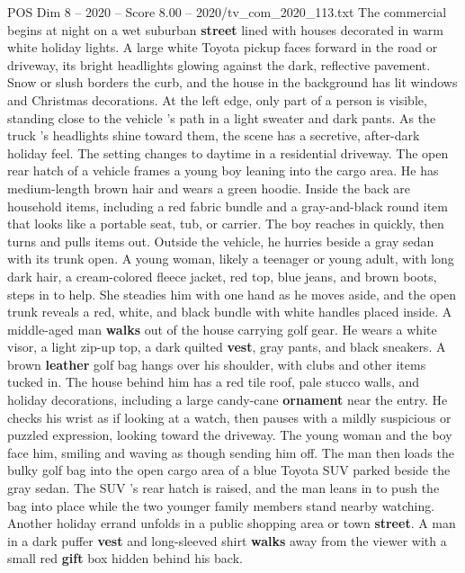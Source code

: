 \begin{textsample}{POS Dim 8 – 2020 – Score 8.00 – 2020/tv\_com\_2020\_113.txt}  \label{ex:f8_pos_052}
The commercial begins at night on a wet suburban \textbf{street} lined with houses decorated in warm white holiday lights.
A large white Toyota pickup faces forward in the road or driveway, its bright headlights glowing against the dark, reflective pavement.
Snow or slush borders the curb, and the house in the background has lit windows and Christmas decorations.
At the left edge, only part of a person is visible, standing close to the vehicle ’s path in a light sweater and dark pants.
As the truck ’s headlights shine toward them, the scene has a secretive, after-dark holiday feel.
The setting changes to daytime in a residential driveway.
The open rear hatch of a vehicle frames a young boy leaning into the cargo area.
He has medium-length brown hair and wears a green hoodie.
Inside the back are household items, including a red fabric bundle and a gray-and-black round item that looks like a portable seat, tub, or carrier.
The boy reaches in quickly, then turns and pulls items out.
Outside the vehicle, he hurries beside a gray sedan with its trunk open.
A young woman, likely a teenager or young adult, with long dark hair, a cream-colored fleece jacket, red top, blue jeans, and brown boots, steps in to help.
She steadies him with one hand as he moves aside, and the open trunk reveals a red, white, and black bundle with white handles placed inside.
A middle-aged man \textbf{walks} out of the house carrying golf gear.
He wears a white visor, a light zip-up top, a dark quilted \textbf{vest}, gray pants, and black sneakers.
A brown \textbf{leather} golf bag hangs over his shoulder, with clubs and other items tucked in.
The house behind him has a red tile roof, pale stucco walls, and holiday decorations, including a large candy-cane \textbf{ornament} near the entry.
He checks his wrist as if looking at a watch, then pauses with a mildly suspicious or puzzled expression, looking toward the driveway.
The young woman and the boy face him, smiling and waving as though sending him off.
The man then loads the bulky golf bag into the open cargo area of a blue Toyota SUV parked beside the gray sedan.
The SUV ’s rear hatch is raised, and the man leans in to push the bag into place while the two younger family members stand nearby watching.
Another holiday errand unfolds in a public shopping area or town \textbf{street}.
A man in a dark puffer \textbf{vest} and long-sleeved shirt \textbf{walks} away from the viewer with a small red \textbf{gift} box hidden behind his back.

\end{textsample}
